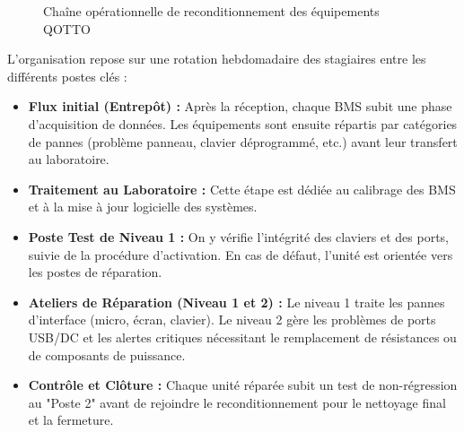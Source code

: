 \begin{figure}[H]
    \centering
    \caption{Chaîne opérationnelle de reconditionnement des équipements QOTTO}
    \label{fig:flux_maintenance}
\end{figure}

L'organisation repose sur une rotation hebdomadaire des stagiaires entre les différents postes clés :
\begin{itemize}
    \item \textbf{Flux initial (Entrepôt) :} Après la réception, chaque BMS subit une phase d'acquisition de données. Les équipements sont ensuite répartis par catégories de pannes (problème panneau, clavier déprogrammé, etc.) avant leur transfert au laboratoire.
    \item \textbf{Traitement au Laboratoire :} Cette étape est dédiée au calibrage des BMS et à la mise à jour logicielle des systèmes.
    \item \textbf{Poste Test de Niveau 1 :} On y vérifie l'intégrité des claviers et des ports, suivie de la procédure d'activation. En cas de défaut, l'unité est orientée vers les postes de réparation.
    \item \textbf{Ateliers de Réparation (Niveau 1 et 2) :} Le niveau 1 traite les pannes d'interface (micro, écran, clavier). Le niveau 2 gère les problèmes de ports USB/DC et les alertes critiques nécessitant le remplacement de résistances ou de composants de puissance.
    \item \textbf{Contrôle et Clôture :} Chaque unité réparée subit un test de non-régression au "Poste 2" avant de rejoindre le reconditionnement pour le nettoyage final et la fermeture.
\end{itemize}

